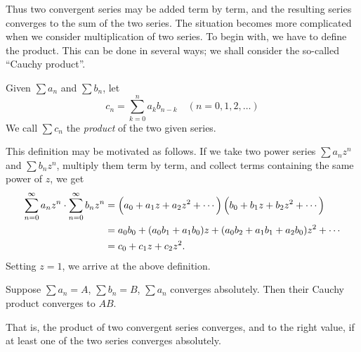 Thus two convergent series may be added term by term, and the resulting series converges to the sum of the two series. The situation becomes more complicated when we consider multiplication of two series. To begin with, we have to define the product. This can be done in several ways; we shall consider the so-called ``Cauchy product''. 

\begin{definition}
Given $\sum a_n$ and $\sum b_n$, let
\[c_n=\sum_{k=0}^{n}a_k b_{n-k}\quad(n=0,1,2,\dots)\]
We call $\sum c_n$ the \emph{product} of the two given series.
\end{definition}

This definition may be motivated as follows. If we take two power series $\sum a_nz^n$ and $\sum b_nz^n$, multiply them term by term, and collect terms containing the same power of $z$, we get
\begin{align*}
\sum_{n=0}^{\infty}a_nz^n\cdot\sum_{n=0}^{\infty}b_nz^n
&=\left(a_0+a_1z+a_2z^2+\cdots\right)\left(b_0+b_1z+b_2z^2+\cdots\right)\\
&=a_0b_0+(a_0b_1+a_1b_0)z+(a_0b_2+a_1b_1+a_2b_0)z^2+\cdots\\
&=c_0+c_1z+c_2z^2.
\end{align*}
Setting $z=1$, we arrive at the above definition. 

\begin{theorem}[Mertens]
Suppose $\sum a_n=A$, $\sum b_n=B$, $\sum a_n$ converges absolutely. Then their Cauchy product converges to $AB$.
\end{theorem}

That is, the product of two convergent series converges, and to the right value, if at least one of the two series converges absolutely.

